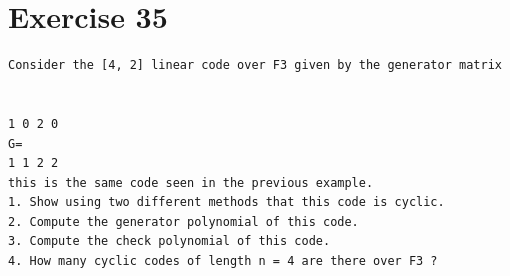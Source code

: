 \documentclass[11pt]{article}
\begin{document}
\section*{Exercise 35}
\begin{exercisebox}
\begin{Verbatim}[fontsize=\small]
Consider the [4, 2] linear code over F3 given by the generator matrix


1 0 2 0
G=
1 1 2 2
this is the same code seen in the previous example.
1. Show using two different methods that this code is cyclic.
2. Compute the generator polynomial of this code.
3. Compute the check polynomial of this code.
4. How many cyclic codes of length n = 4 are there over F3 ?
\end{Verbatim}
\end{exercisebox}
\end{document}
